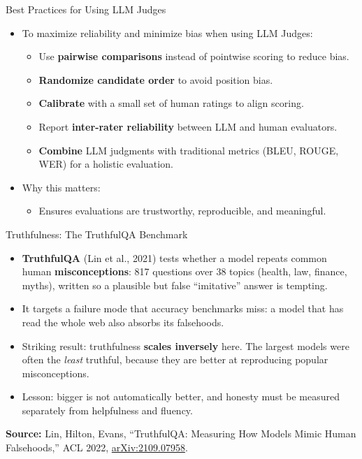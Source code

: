 \begin{frame}[allowframebreaks]{Best Practices for Using LLM Judges}

\begin{itemize}
    \item To maximize reliability and minimize bias when using LLM Judges:

    \begin{itemize}
        \item Use \textbf{pairwise comparisons} instead of pointwise scoring to reduce bias.  
        \item \textbf{Randomize candidate order} to avoid position bias.  
        \item \textbf{Calibrate} with a small set of human ratings to align scoring.  
        \item Report \textbf{inter-rater reliability} between LLM and human evaluators.  
        \item \textbf{Combine} LLM judgments with traditional metrics (BLEU, ROUGE, WER) for a holistic evaluation.
    \end{itemize}

    \item Why this matters:
    \begin{itemize}
        \item Ensures evaluations are trustworthy, reproducible, and meaningful.
    \end{itemize}
\end{itemize}

\end{frame}


\begin{frame}{Truthfulness: The TruthfulQA Benchmark}
  \begin{itemize}\itemsep0.45em
    \item[\textcolor{red}{$\blacktriangleright$}] \textbf{TruthfulQA} (Lin et al., 2021) tests whether a model repeats common human \textbf{misconceptions}: 817 questions over 38 topics (health, law, finance, myths), written so a plausible but false ``imitative'' answer is tempting.
    \item[\textcolor{red}{$\blacktriangleright$}] It targets a failure mode that accuracy benchmarks miss: a model that has read the whole web also absorbs its falsehoods.
    \item[\textcolor{red}{$\blacktriangleright$}] Striking result: truthfulness \textbf{scales inversely} here. The largest models were often the \textit{least} truthful, because they are better at reproducing popular misconceptions.
    \item[\textcolor{red}{$\blacktriangleright$}] Lesson: bigger is not automatically better, and honesty must be measured separately from helpfulness and fluency.
  \end{itemize}
  \vspace{0.3em}
  {\scriptsize \textbf{Source:} Lin, Hilton, Evans, ``TruthfulQA: Measuring How Models Mimic Human Falsehoods,'' ACL 2022, \href{https://arxiv.org/abs/2109.07958}{arXiv:2109.07958}.}
\end{frame}


